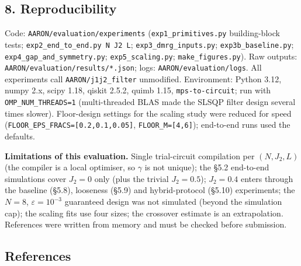 \documentclass[
]{article}
\begin{document}
\hypertarget{reproducibility}{%
\subsection{8. Reproducibility}\label{reproducibility}}

Code: \texttt{AARON/evaluation/experiments}
(\texttt{exp1\_primitives.py} building-block tests;
\texttt{exp2\_end\_to\_end.py\ N\ J2\ L};
\texttt{exp3\_dmrg\_inputs.py}; \texttt{exp3b\_baseline.py};
\texttt{exp4\_gap\_and\_symmetry.py}; \texttt{exp5\_scaling.py};
\texttt{make\_figures.py}). Raw outputs:
\texttt{AARON/evaluation/results/*.json}; logs:
\texttt{AARON/evaluation/logs}. All experiments call
\texttt{AARON/j1j2\_filter} unmodified. Environment: Python 3.12, numpy
2.x, scipy 1.18, qiskit 2.5.2, quimb 1.15, \texttt{mps-to-circuit}; run
with \texttt{OMP\_NUM\_THREADS=1} (multi-threaded BLAS made the SLSQP
filter design several times slower). Floor-design settings for the
scaling study were reduced for speed
(\texttt{FLOOR\_EPS\_FRACS={[}0.2,0.1,0.05{]}},
\texttt{FLOOR\_M={[}4,6{]}}); end-to-end runs used the defaults.

\textbf{Limitations of this evaluation.} Single trial-circuit
compilation per \((N,J_2,L)\) (the compiler is a local optimiser, so
\(\gamma\) is not unique); the §5.2 end-to-end simulations cover
\(J_2=0\) only (plus the trivial \(J_2=0.5\)); \(J_2=0.4\) enters
through the baseline (§5.8), looseness (§5.9) and hybrid-protocol
(§5.10) experiments; the \(N=8\), \(\varepsilon=10^{-3}\) guaranteed
design was not simulated (beyond the simulation cap); the scaling fits
use four sizes; the crossover estimate is an extrapolation. References
were written from memory and must be checked before submission.

\hypertarget{references}{%
\subsection{References}\label{references}}
\end{document}
